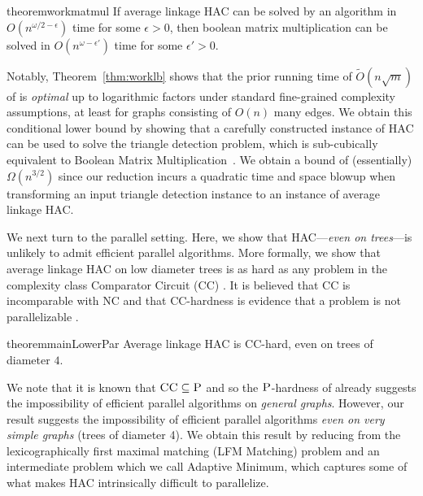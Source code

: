 \documentclass[11pt]{article}
\newcommand{\am}{\textsf{Adaptive Minimum}\xspace}
\newcommand{\lfm}{\textsf{LFM Matching}\xspace}
\newcommand{\CC}{\textsc{CC}\xspace}
\newcommand{\NC}{\textsc{NC}\xspace}
\newcommand{\PTime}{\textsc{P}\xspace}
\begin{document}
\begin{restatable}{theorem}{workmatmul}\label{cor:workmatmul}
If average linkage HAC can be solved by an algorithm in $O(n^{\omega/2-\epsilon})$ time for some $\epsilon > 0$, then boolean matrix multiplication can be solved in $O(n^{\omega - \epsilon'})$ time for some $\epsilon' > 0$.
\end{restatable}

\noindent 
Notably, Theorem~\ref{thm:worklb} shows that the prior running time of $\tilde{O}(n \sqrt{m})$ of \cite{dhulipala2021hierarchical} is {\em optimal} up to logarithmic factors under standard fine-grained complexity assumptions, at least for graphs consisting of $O(n)$ many edges.
We obtain this conditional lower bound by showing that a carefully constructed instance of HAC can be used to solve the triangle detection problem, which is sub-cubically equivalent to Boolean Matrix Multiplication~\cite{williams2010subcubic}.
We obtain a bound of (essentially) $\Omega(n^{3/2})$ since our reduction incurs a quadratic time and space blowup when transforming an input triangle detection instance to an instance of average linkage HAC.

We next turn to the parallel setting. 
Here, we show that HAC---\emph{even on trees}---is unlikely to admit efficient parallel algorithms. 
More formally, we show that average linkage HAC on low diameter trees is as hard as any problem in the complexity class Comparator Circuit (\CC) \cite{subramanian1989new, cook2014complexity}. 
It is believed that \CC is incomparable with \NC and that \CC-hardness is evidence that a problem is not parallelizable \cite{mayr1992complexity, cook2014complexity}.

\begin{restatable}{theorem}{mainLowerPar}\label{thm:mainLowerPar}
Average linkage HAC is \CC-hard, even on trees of diameter $4$.
\end{restatable}

\noindent We note that it is known that $\CC \subseteq \PTime$ and so the $\PTime$-hardness of \cite{dhulipala2022hierarchical} already suggests the impossibility of efficient parallel algorithms on \emph{general graphs}. 
However, our result suggests the impossibility of efficient parallel algorithms \emph{even on very simple graphs} (trees of diameter 4).
We obtain this result by reducing from the lexicographically first maximal matching (\lfm) problem and an intermediate problem which we call \am, which captures some of what makes HAC intrinsically difficult to parallelize.
\end{document}
